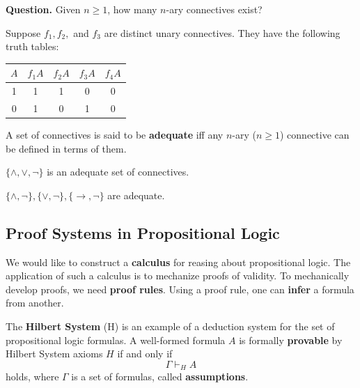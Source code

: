 \documentclass[english, 11pt]{article}
\begin{document}
  \textbf{Question.} Given $n \geq 1$, how many $n$-ary connectives exist?

  \begin{exmp} Suppose $f_1, f_2,$ and $f_3$ are distinct unary connectives. They have the following truth tables:
  \begin{center}
  \begin{tabular}{c | c c c c}
    $A$ & $f_1A$ & $f_2A$ & $f_3A$ & $f_4A$ \\
    \hline
    1 & 1 & 1 & 0 & 0 \\
    0 & 1 & 0 & 1 & 0
  \end{tabular}
  \end{center}

  \begin{defn}[adequate]\label{adequate}
    A set of connectives is said to be \textbf{adequate} iff any $n$-ary ($n \geq 1$) connective can be defined in terms of them.
  \end{defn}

  \begin{thrm}
    $\{\land, \lor, \neg \}$ is an adequate set of connectives.
  \end{thrm}

  \begin{cor}
    $\{ \land, \neg \}, \{\lor, \neg\}, \{ \rightarrow, \neg \}$ are adequate.
  \end{cor}

  \end{exmp}

  \subsection[Proof Systems]{Proof Systems in Propositional Logic}

  We would like to construct a \textbf{calculus} for reasing about propositional logic. The application of such a calculus is to mechanize proofs of validity. To mechanically develop proofs, we need \textbf{proof rules}. Using a proof rule, one can \textbf{infer} a formula from another.

  \begin{defn}\label{hilbert}
    The \textbf{Hilbert System} (H) is an example of a deduction system for the set of propositional logic formulas. A well-formed formula $A$ is formally \textbf{provable} by Hilbert System axioms $H$ if and only if
    \[ \Gamma \vdash_H A \]
    holds, where $\Gamma$ is a set of formulas, called \textbf{assumptions}.
  \end{defn}
\end{document}
